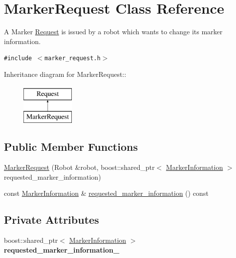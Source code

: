 \hypertarget{class_marker_request}{
\section{MarkerRequest Class Reference}
\label{class_marker_request}
}
A Marker \hyperlink{class_request}{Request} is issued by a robot which wants to change its marker information.  


{\tt \#include $<$marker\_\-request.h$>$}

Inheritance diagram for MarkerRequest::\begin{figure}[H]
\begin{center}
\leavevmode
\includegraphics[height=2cm]{class_marker_request}
\end{center}
\end{figure}
\subsection*{Public Member Functions}
\begin{CompactItemize}
\item 
\hyperlink{class_marker_request_70e6f1fa26f348ec9cfc8e9880a4bb29}{MarkerRequest} (Robot \&robot, boost::shared\_\-ptr$<$ \hyperlink{class_marker_information}{MarkerInformation} $>$ requested\_\-marker\_\-information)
\item 
const \hyperlink{class_marker_information}{MarkerInformation} \& \hyperlink{class_marker_request_709617b7716a3f5305782bc18067d357}{requested\_\-marker\_\-information} () const 
\end{CompactItemize}
\subsection*{Private Attributes}
\begin{CompactItemize}
\item 
\hypertarget{class_marker_request_663c5ca8defcffb014b12787068ff94d}{
boost::shared\_\-ptr$<$ \hyperlink{class_marker_information}{MarkerInformation} $>$ \textbf{requested\_\-marker\_\-information\_\-}}
\label{class_marker_request_663c5ca8defcffb014b12787068ff94d}

\end{CompactItemize}


